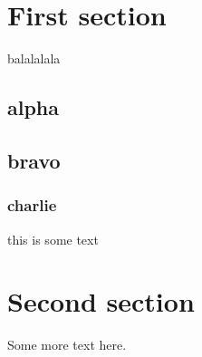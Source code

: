 \section{First section}
balalalala
\subsection{alpha}
\subsection{bravo}
\subsubsection{charlie}
this is some text
\section{Second section}
Some more text here\cite{test1}.